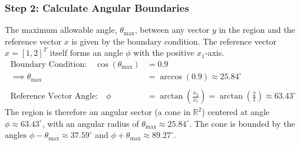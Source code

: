 \documentclass{article}
\begin{document}
\subsubsection*{Step 2: Calculate Angular Boundaries}
The maximum allowable angle, $\theta_{\text{max}}$, between any vector $y$ in the region and the reference vector $x$ is given by the boundary condition. The reference vector $x = [1, 2]^T$ itself forms an angle $\phi$ with the positive $x_1$-axis.
\begin{align*}
    \text{Boundary Condition:}\quad \cos(\theta_{\text{max}}) &= 0.9 \\
    \implies \theta_{\text{max}} &= \arccos(0.9) \approx 25.84^\circ \\
    \\
    \text{Reference Vector Angle:}\quad \phi &= \arctan\left(\frac{x_2}{x_1}\right) = \arctan\left(\frac{2}{1}\right) \approx 63.43^\circ
\end{align*}
The region is therefore an angular sector (a cone in $\mathbb{R}^2$) centered at angle $\phi \approx 63.43^\circ$, with an angular radius of $\theta_{\text{max}} \approx 25.84^\circ$. The cone is bounded by the angles $\phi - \theta_{\text{max}} \approx 37.59^\circ$ and $\phi + \theta_{\text{max}} \approx 89.27^\circ$.
\end{document}
